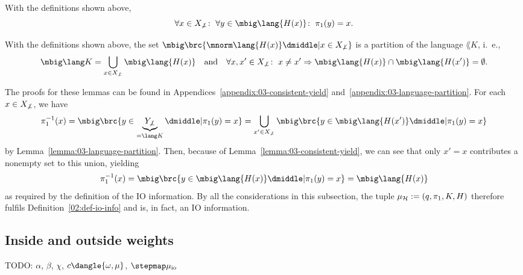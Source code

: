 \begin{lemma}\label{lemma:03-consistent-yield}
 With the definitions shown above,
 \[
  \forall x\in X_{\not\bot}\colon\;
  \forall y\in \mbig\lang{H(x)}\colon\;
  \pi_1(y) = x.
 \]
\end{lemma}

\begin{lemma}\label{lemma:03-language-partition}
 With the definitions shown above, the set $\mbig\brc{\mnorm\lang{H(x)}
 \dmiddle| x\in X_{\not\bot}}$ is a partition of the language $\lang K$, i.~e.,
 \[
  \mbig\lang K = \bigcup_{x\in X_{\not\bot}} \mbig\lang{H(x)}
  \quad\text{and}\quad
  \forall x,x'\in X_{\not\bot}\colon\; x\neq x' \Rightarrow \mbig\lang{H(x)} \cap \mbig\lang{H(x')} = \emptyset.
 \]
\end{lemma}

The proofs for these lemmas can be found in Appendices~\ref{appendix:03-consistent-yield} and~\ref{appendix:03-language-partition}. For each $x\in X_{\not\bot}$, we have
\[
 \pi_1^{-1}(x)
 = \mbig\brc{y\in \underbrace{Y_{\not\bot}}_{=\lang K} \dmiddle| \pi_1(y) = x}
 = \bigcup_{x'\in X_{\not\bot}} \mbig\brc{y\in\mbig\lang{H(x')} \dmiddle| \pi_1(y) = x}
\]
by Lemma~\ref{lemma:03-language-partition}. Then, because of
Lemma~\ref{lemma:03-consistent-yield}, we can see that only $x'=x$ contributes
a nonempty set to this union, yielding
\[
 \pi_1^{-1}(x) = \mbig\brc{y\in\mbig\lang{H(x)} \dmiddle| \pi_1(y) = x} = \mbig\lang{H(x)}
\]
as required by the definition of the IO information. By all the considerations
in this subsection, the tuple $\mu_\mathcal H := (q,\pi_1,K,H)$ therefore fulfils
Definition~\ref{02:def-io-info} and is, in fact, an IO information.

\subsection{Inside and outside weights}

{\color{red}TODO: $\alpha$, $\beta$, $\chi$, $c\dangle{\omega,\mu}$, $\stepmap\mu_\mathrm{io}$}
